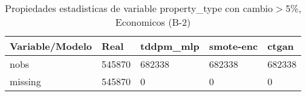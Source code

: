 \begin{table}[H]
\centering
\fontsize{8}{14}\selectfont
\caption{Propiedades estadisticas de variable property\_type con cambio\ensuremath{>}5\%, Economicos (B-2)}
\label{table-stats-economicos-b-2-property_type-short}
\begin{tabular}{|l|m{10em}|m{10em}|m{10em}|m{10em}|}
\hline
 \rowcolor[gray]{0.8}
Variable/Modelo & Real & tddpm\_mlp & smote-enc & ctgan \\
\hline nobs & 545870 & 682338 & 682338 & 682338 \\
\hline missing & 545870 & 0 & 0 & 0 \\
\hline
\end{tabular}
\end{table}
